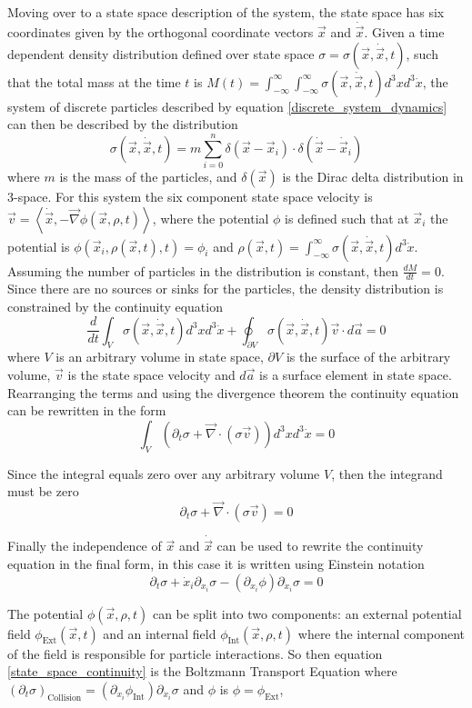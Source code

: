 \documentclass[%
 twocolumn,
 amsmath,amssymb,
 aps,
]{revtex4-1}
\newcommand{\dvec}[1]{\dot{\vec{#1}}}
\newcommand{\grad}{\vec{\nabla}}
\newcommand{\intVdot}[1]{\int_{-\infty}^{\infty} #1 d^3\dot{x}}
\newcommand{\intVVdot}[1]{\int_{-\infty}^{\infty}\int_{-\infty}^{\infty} #1 d^3xd^3\dot{x}}
\begin{document}
Moving over to a state space description of the system, the state space has six coordinates given by the orthogonal coordinate vectors $\vec{x}$ and $\dvec{x}$. Given a time dependent density distribution defined over state space $\sigma=\sigma(\vec{x}, \dvec{x}, t)$, such that the total mass at the time $t$ is $M(t)=\intVVdot{\sigma(\vec{x}, \dvec{x}, t)}$, the system of discrete particles described by equation \eqref{discrete_system_dynamics} can then be described by the distribution
\[
\sigma(\vec{x}, \dvec{x}, t) = m\sum^n_{i=0}\delta(\vec{x} - \vec{x}_i)\cdot\delta(\dvec{x} - \dvec{x}_i)
\]
where $m$ is the mass of the particles, and $\delta(\vec{x})$ is the Dirac delta distribution in 3-space. For this system the six component state space velocity is $\vec{v}=\left\langle\dvec{x}, -\grad\phi(\vec{x}, \rho, t)\right\rangle$, where the potential $\phi$ is defined such that at $\vec{x}_i$ the potential is $\phi(\vec{x}_i, \rho(\vec{x}, t), t)=\phi_i$ and $\rho(\vec{x}, t)=\intVdot{\sigma(\vec{x}, \dvec{x}, t)}$. Assuming the number of particles in the distribution is constant, then $\frac{dM}{dt}=0$. Since there are no sources or sinks for the particles, the density distribution is constrained by the continuity equation
\[
\frac{d}{dt}\int_{V}\sigma(\vec{x}, \dvec{x}, t)d^3xd^3\dot{x}+\oint_{\partial V}\sigma(\vec{x}, \dvec{x}, t)\vec{v}\cdot d\vec{a}=0
\]
where $V$ is an arbitrary volume in state space, $\partial V$ is the surface of the arbitrary volume, $\vec{v}$ is the state space velocity and $d\vec{a}$ is a surface element in state space. Rearranging the terms and using the divergence theorem the continuity equation can be rewritten in the form
\[
\int_V\left(\partial_t\sigma + \grad\cdot\left(\sigma\vec{v}\right)\right)d^3xd^3\dot{x}=0
\]

Since the integral equals zero over any arbitrary volume $V$, then the integrand must be zero
\[
\partial_t \sigma + \grad\cdot\left(\sigma\vec{v}\right)=0
\]

Finally the independence of $\vec{x}$ and $\dvec{x}$ can be used to rewrite the continuity equation in the final form, in this case it is written using Einstein notation
\begin{equation}
\partial_t \sigma + \dot{x}_i\partial_{x_i}\sigma-\left(\partial_{x_i}\phi\right)\partial_{\dot{x}_i}\sigma=0
\label{state_space_continuity}
\end{equation}

The potential $\phi(\vec{x}, \rho, t)$ can be split into two components: an external potential field $\phi_{\text{Ext}}(\vec{x}, t)$ and an internal field $\phi_{\text{Int}}(\vec{x}, \rho, t)$ where the internal component of the field is responsible for particle interactions. So then equation \eqref{state_space_continuity} is the Boltzmann Transport Equation where $\left(\partial_t \sigma\right)_{\text{Collision}} = \left(\partial_{x_i}\phi_{\text{Int}}\right)\partial_{\dot{x}_i}\sigma$ and $\phi$ is $\phi = \phi_{\text{Ext}}$,
\end{document}
